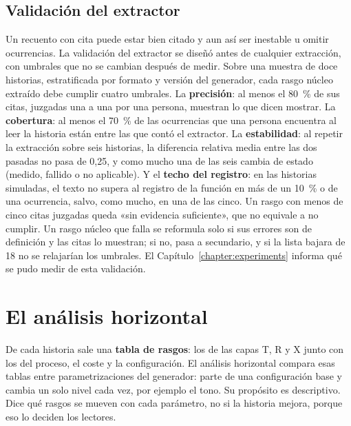 \subsection{Validación del extractor}\label{sec:validacion-extractor}

Un recuento con cita puede estar bien citado y aun así ser inestable u omitir ocurrencias. La
validación del extractor se diseñó antes de cualquier extracción, con umbrales que no se cambian
después de medir. Sobre una muestra de doce historias, estratificada por formato y versión del
generador, cada rasgo núcleo extraído debe cumplir cuatro umbrales. La \textbf{precisión}: al menos
el 80~\% de sus citas, juzgadas una a una por una persona, muestran lo que dicen mostrar. La
\textbf{cobertura}: al menos el 70~\% de las ocurrencias que una persona encuentra al leer la
historia están entre las que contó el extractor. La \textbf{estabilidad}: al repetir la extracción
sobre seis historias, la diferencia relativa media entre las dos pasadas no pasa de 0,25, y como
mucho una de las seis cambia de estado (medido, fallido o no aplicable). Y el \textbf{techo del
registro}: en las historias simuladas, el texto no supera al registro de la función en más de un
10~\% o de una ocurrencia, salvo, como mucho, en una de las cinco. Un rasgo con menos de cinco citas
juzgadas queda «sin evidencia suficiente», que no equivale a no cumplir. Un rasgo núcleo que falla
se reformula solo si sus errores son de definición y las citas lo muestran; si no, pasa a
secundario, y si la lista bajara de 18 no se relajarían los umbrales. El
Capítulo~\ref{chapter:experiments} informa qué se pudo medir de esta validación.

\section{El análisis horizontal}\label{sec:horizontal}

De cada historia sale una \textbf{tabla de rasgos}: los de las capas T, R y X junto con los del
proceso, el coste y la configuración. El análisis horizontal compara esas tablas entre
parametrizaciones del generador: parte de una configuración base y cambia un solo nivel cada vez,
por ejemplo el tono. Su propósito es descriptivo. Dice qué rasgos se mueven con cada parámetro, no si
la historia mejora, porque eso lo deciden los lectores.

